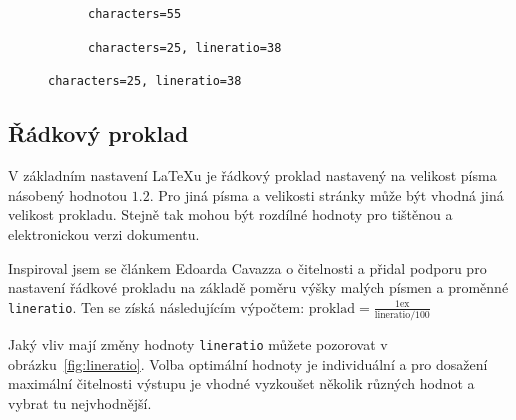 \documentclass{csbulletin}
\begin{document}
\begin{figure}[tbp]
  \caption{Rozdíl velikosti písma v závislosti na počtu znaků}
  \label{fig:fontsize}
  \begin{subfigure}[t]{0.45\textwidth}
\caption{\texttt{characters=55}}
\end{subfigure}
\hfill
\begin{subfigure}[t]{0.45\textwidth}
\caption{\texttt{characters=25, lineratio=38}}
\end{subfigure}
\end{figure}

\subsection{Řádkový proklad}

V základním nastavení \LaTeX u je řádkový proklad nastavený
na velikost písma násobený hodnotou $1.2$. Pro jiná 
písma a velikosti stránky může být vhodná jiná velikost prokladu.
Stejně tak mohou být rozdílné hodnoty pro tištěnou a elektronickou 
verzi dokumentu. 

Inspiroval jsem se článkem Edoarda Cavazza \cite{cavazza} o čitelnosti
a přidal podporu pro nastavení řádkové prokladu na základě poměru výšky 
malých písmen a proměnné \texttt{lineratio}. Ten se získá následujícím 
výpočtem: $\text{proklad} = \frac{1\text{ex}}{\text{lineratio}/ 100}$

Jaký vliv mají změny hodnoty \texttt{lineratio} můžete pozorovat v obrázku~\ref{fig:lineratio}. 
Volba optimální hodnoty je individuální a pro dosažení maximální čitelnosti
výstupu je vhodné vyzkoušet několik různých hodnot a vybrat tu nejvhodnější.
\end{document}
